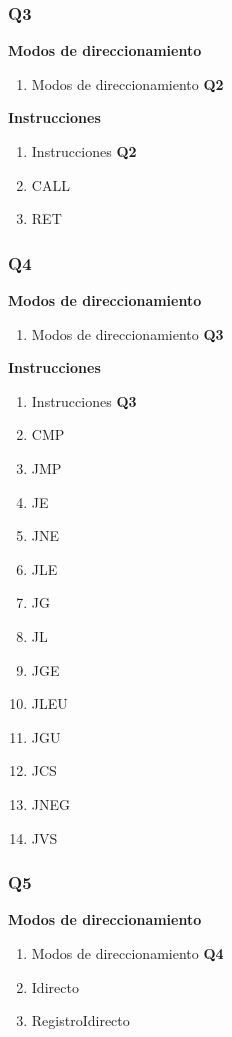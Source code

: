 \subsubsection{Q3}

\textbf{Modos de direccionamiento}
\begin{enumerate}
\item Modos de direccionamiento \textbf{Q2}
\end{enumerate}

\textbf{Instrucciones}
\begin{enumerate}
\item Instrucciones \textbf{Q2}
\item CALL
\item RET
\end{enumerate}

\subsubsection{Q4}

\textbf{Modos de direccionamiento}
\begin{enumerate}
\item Modos de direccionamiento \textbf{Q3}
\end{enumerate}

\textbf{Instrucciones}
\begin{enumerate}
\item Instrucciones \textbf{Q3}
\item CMP
\item JMP
\item JE 
\item JNE 
\item JLE 
\item JG 
\item JL 
\item JGE 
\item JLEU 
\item JGU 
\item JCS 
\item JNEG 
\item JVS
\end{enumerate}

\subsubsection{Q5}

\textbf{Modos de direccionamiento}
\begin{enumerate}
\item Modos de direccionamiento \textbf{Q4}
\item Idirecto
\item RegistroIdirecto
\end{enumerate}

